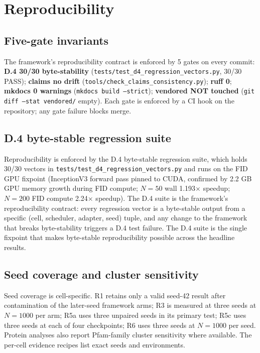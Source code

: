 \documentclass[journal,twocolumn,final]{IEEEtran}
\begin{document}
\section{Reproducibility}
\label{sec:repro}

\subsection{Five-gate invariants}

The framework's reproducibility contract is enforced by 5 gates on every commit: \textbf{D.4 30/30 byte-stability} (\texttt{tests/test\_d4\_regression\_vectors.py}, 30/30 PASS); \textbf{claims no drift} (\texttt{tools/check\_claims\_consistency.py}); \textbf{ruff 0}; \textbf{mkdocs 0 warnings} (\texttt{mkdocs build --strict}); \textbf{vendored NOT touched} (\texttt{git diff --stat vendored/} empty). Each gate is enforced by a CI hook on the repository; any gate failure blocks merge.

\subsection{D.4 byte-stable regression suite}

Reproducibility is enforced by the D.4 byte-stable regression suite, which holds 30/30 vectors in \texttt{tests/\allowbreak test\_d4\_\allowbreak regression\_\allowbreak vectors.py} and runs on the FID GPU fixpoint (InceptionV3 forward pass pinned to CUDA, confirmed by 2.2 GB GPU memory growth during FID compute; $N = 50$ wall 1.193\ensuremath{\times} speedup; $N = 200$ FID compute 2.24\ensuremath{\times} speedup). The D.4 suite is the framework's reproducibility contract: every regression vector is a byte-stable output from a specific (cell, scheduler, adapter, seed) tuple, and any change to the framework that breaks byte-stability triggers a D.4 test failure. The D.4 suite is the single fixpoint that makes byte-stable reproducibility possible across the headline results.

\subsection{Seed coverage and cluster sensitivity}
Seed coverage is cell-specific. R1 retains only a valid seed-42 result after contamination of the later-seed framework arms; R3 is measured at three seeds at $N=1000$ per arm; R5a uses three unpaired seeds in its primary test; R5c uses three seeds at each of four checkpoints; R6 uses three seeds at $N=1000$ per seed. Protein analyses also report Pfam-family cluster sensitivity where available. The per-cell evidence recipes list exact seeds and environments.
\end{document}
